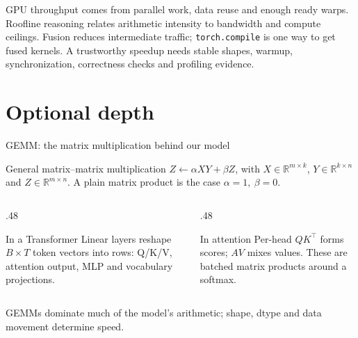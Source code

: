 \documentclass[handout]{beamer}
\begin{document}
\takeaways
{GPU throughput comes from parallel work, data reuse and enough ready warps.}
{Roofline reasoning relates arithmetic intensity to bandwidth and compute ceilings.}
{Fusion reduces intermediate traffic; \texttt{torch.compile} is one way to get fused kernels.}
{A trustworthy speedup needs stable shapes, warmup, synchronization, correctness checks and profiling evidence.}

\appendix
\section{Optional depth}

\begin{frame}{GEMM: the matrix multiplication behind our model}
  \begin{block}{General matrix--matrix multiplication}
    $Z \leftarrow \alpha XY + \beta Z$, with $X\in\mathbb{R}^{m\times k}$,
    $Y\in\mathbb{R}^{k\times n}$ and $Z\in\mathbb{R}^{m\times n}$.
    A plain matrix product is the case $\alpha=1,\ \beta=0$.
  \end{block}
  \begin{columns}[t]
    \begin{column}{.48\linewidth}
      \begin{block}{In a Transformer}
        Linear layers reshape $B\times T$ token vectors into rows: Q/K/V, attention output, MLP and vocabulary projections.
      \end{block}
    \end{column}
    \begin{column}{.48\linewidth}
      \begin{block}{In attention}
        Per-head $QK^\top$ forms scores; $AV$ mixes values. These are batched matrix products around a softmax.
      \end{block}
    \end{column}
  \end{columns}
  \vfill
  \small GEMMs dominate much of the model's arithmetic; shape, dtype and data movement determine speed.
\end{frame}
\end{document}
